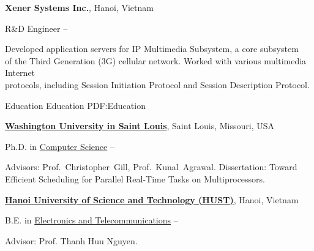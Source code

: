 \documentclass[letterpaper,MMMyyyy,nonstopmode]{simpleresumecv}
\begin{document}
\begin{Body}
\BigGap
\Entry
{\textbf{Xener Systems Inc.}}, Hanoi, Vietnam

\Gap
\BulletItem
R\&D Engineer
\hfill
{} -- 
\begin{Detail}
\SubBulletItem
Developed application servers for IP Multimedia Subsystem, a core subsystem \\
of the Third Generation (3G) cellular network. Worked with various multimedia Internet \\
protocols, including Session Initiation Protocol and Session Description Protocol. 
\end{Detail}


\Section
{Education}
{Education}
{PDF:Education}

\Entry
\href{https://wustl.edu}
{\textbf{Washington University in Saint Louis}},
Saint Louis, Missouri, USA

\Gap
\BulletItem
Ph.D. in 
\href{https://cse.wustl.edu/Pages/default.aspx}
{Computer Science}
\hfill
{} -- 
\begin{Detail}
\SubBulletItem
Advisors:
Prof.~Christopher~Gill, Prof.~Kunal~Agrawal.
\SubBulletItem
Dissertation: Toward Efficient Scheduling for Parallel Real-Time Tasks on Multiprocessors.
\end{Detail}



\BigGap
\Entry
\href{https://en.hust.edu.vn/home}
{\textbf{Hanoi University of Science and Technology (HUST)}},
Hanoi, Vietnam

\Gap
\BulletItem
B.E. in
\href{http://set.hust.edu.vn/index.php/en}
{Electronics and Telecommunications}
\hfill
{} --
\begin{Detail}
\SubBulletItem
Advisor: Prof. Thanh Huu Nguyen.
\end{Detail}



\end{Body}
\end{document}
